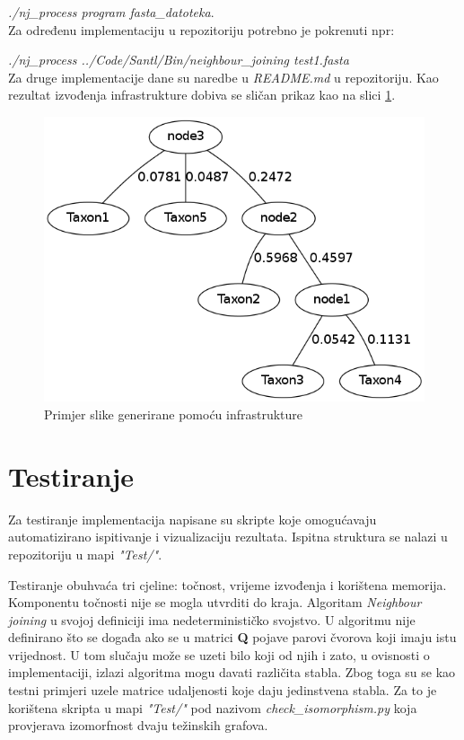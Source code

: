 \documentclass[times, utf8, seminar, numeric]{fer}
\begin{document}
\emph{./nj\_process program fasta\_datoteka}.\\ 
Za određenu implementaciju u repozitoriju potrebno je pokrenuti npr:

\emph{./nj\_process ../Code/Santl/Bin/neighbour\_joining test1.fasta}\\
Za druge implementacije dane su naredbe u \emph{README.md} u repozitoriju. Kao rezultat izvođenja infrastrukture dobiva se sličan prikaz kao na slici \ref{ref:infra}.

\begin{figure}[htb]
\centering
\includegraphics[scale=0.6]{./img/infra.png}
\caption{Primjer slike generirane pomoću infrastrukture}
\label{ref:infra}
\end{figure}

\newpage
\section{Testiranje}

Za testiranje implementacija napisane su skripte koje omogućavaju automatizirano ispitivanje i vizualizaciju rezultata. Ispitna struktura se nalazi u repozitoriju u mapi \emph{"Test/"}.

Testiranje obuhvaća tri cjeline: točnost, vrijeme izvođenja i korištena memorija. Komponentu točnosti nije se mogla utvrditi do kraja. Algoritam \emph{Neighbour joining} u svojoj definiciji ima nedeterminističko svojstvo. U algoritmu nije definirano što se događa ako se u matrici \textbf{Q} pojave parovi čvorova koji imaju istu vrijednost. U tom slučaju može se uzeti bilo koji od njih i zato, u ovisnosti o implementaciji, izlazi algoritma mogu davati različita stabla. Zbog toga su se kao testni primjeri uzele matrice udaljenosti koje daju jedinstvena stabla. Za to je korištena skripta u mapi \emph{"Test/"} pod nazivom \emph{check\_isomorphism.py} koja provjerava izomorfnost dvaju težinskih grafova.
\end{document}
